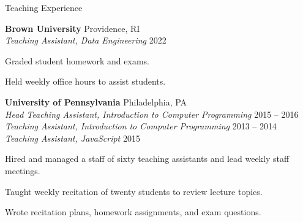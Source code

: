 \documentclass{resume} %
\begin{document}

\begin{grouping}{Teaching Experience}

\item {\bf Brown University } \hfill Providence, RI \\
    {\em Teaching Assistant, Data Engineering} \hfill 2022
    \begin{items}
        \item Graded student homework and exams.
        \item Held weekly office hours to assist students.
    \end{items}

\item {\bf University of Pennsylvania } \hfill Philadelphia, PA \\
    {\em Head Teaching Assistant, Introduction to Computer Programming} \hfill 2015 -- 2016 \\
    {\em Teaching Assistant, Introduction to Computer Programming} \hfill 2013 -- 2014 \\
    {\em Teaching Assistant, JavaScript} \hfill 2015
    \begin{items}
        \item Hired and managed a staff of sixty teaching assistants and lead weekly staff meetings.
        \item Taught weekly recitation of twenty students to review lecture topics.
        \item Wrote recitation plans, homework assignments, and exam questions.
    \end{items}


\end{grouping}
\end{document}
